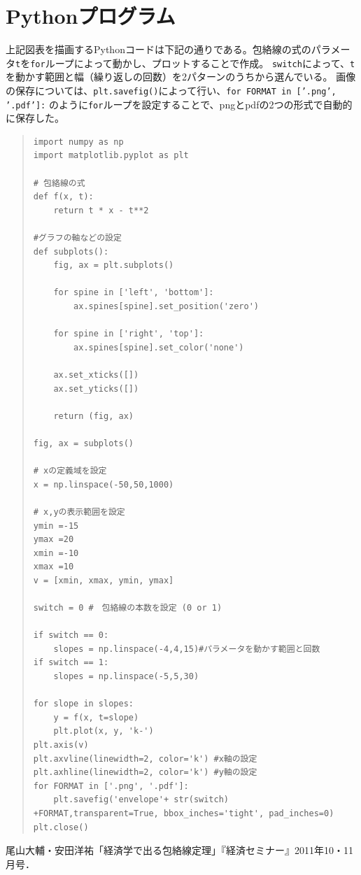 \documentclass[11pt,a4j,fleqn]{jarticle}
\begin{document}
\newpage

\section{Pythonプログラム}

上記図表を描画するPythonコードは下記の通りである。包絡線の式のパラメータ\texttt{t}を\texttt{for}ループによって動かし、プロットすることで作成。
\texttt{switch}によって、\texttt{t}を動かす範囲と幅（繰り返しの回数）を2パターンのうちから選んでいる。
画像の保存については、\texttt{plt.savefig()}によって行い、\texttt{for FORMAT in ['.png', '.pdf']:} のように\texttt{for}ループを設定することで、pngとpdfの2つの形式で自動的に保存した。


\begin{quote}
\begin{verbatim}
import numpy as np
import matplotlib.pyplot as plt

# 包絡線の式
def f(x, t):
    return t * x - t**2

#グラフの軸などの設定
def subplots():
    fig, ax = plt.subplots()

    for spine in ['left', 'bottom']:
        ax.spines[spine].set_position('zero')
        
    for spine in ['right', 'top']:
        ax.spines[spine].set_color('none') 

    ax.set_xticks([])
    ax.set_yticks([]) 
    
    return (fig, ax)

fig, ax = subplots() 

# xの定義域を設定
x = np.linspace(-50,50,1000)

# x,yの表示範囲を設定
ymin =-15
ymax =20
xmin =-10
xmax =10
v = [xmin, xmax, ymin, ymax]

switch = 0 #　包絡線の本数を設定 (0 or 1)

if switch == 0:
	slopes = np.linspace(-4,4,15)#パラメータを動かす範囲と回数
if switch == 1:
	slopes = np.linspace(-5,5,30)

for slope in slopes:
    y = f(x, t=slope)
    plt.plot(x, y, 'k-')
plt.axis(v)
plt.axvline(linewidth=2, color='k') #x軸の設定
plt.axhline(linewidth=2, color='k') #y軸の設定
for FORMAT in ['.png', '.pdf']:
	plt.savefig('envelope'+ str(switch) +FORMAT,transparent=True, bbox_inches='tight', pad_inches=0)
plt.close()

\end{verbatim}
\end{quote}


\begin{thebibliography}{0}
尾山大輔・安田洋祐「経済学で出る包絡線定理」『経済セミナー』2011年10・11月号．
\end{thebibliography}
\end{document}
